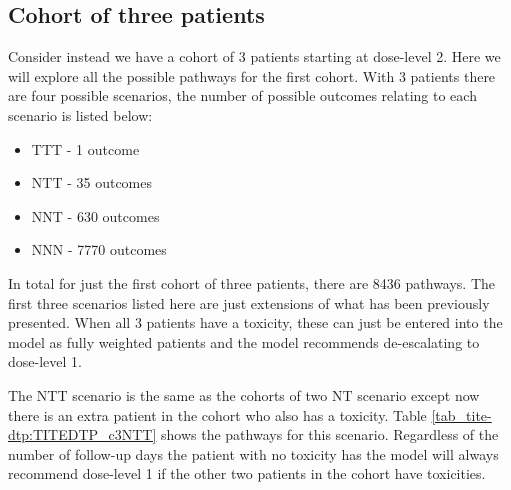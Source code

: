 
\subsection{Cohort of three patients}
Consider instead we have a cohort of 3 patients starting at dose-level 2. Here we will explore all the possible pathways for the first cohort. With 3 patients there are four possible scenarios, the number of possible outcomes relating to each scenario is listed below: 

\begin{itemize}
	\item TTT - 1 outcome 
	\item NTT - 35 outcomes 
	\item NNT - 630 outcomes 
	\item NNN - 7770 outcomes 
\end{itemize}

In total for just the first cohort of three patients, there are 8436 pathways. The first three scenarios listed here are just extensions of what has been previously presented. When all 3 patients have a toxicity, these can just be entered into the model as fully weighted patients and the model recommends de-escalating to dose-level 1. 

The NTT scenario is the same as the cohorts of two NT scenario except now there is an extra patient in the cohort who also has a toxicity. Table \ref{tab_tite-dtp:TITEDTP_c3NTT} shows the pathways for this scenario. Regardless of the number of follow-up days the patient with no toxicity has the model will always recommend dose-level 1 if the other two patients in the cohort have toxicities. 

